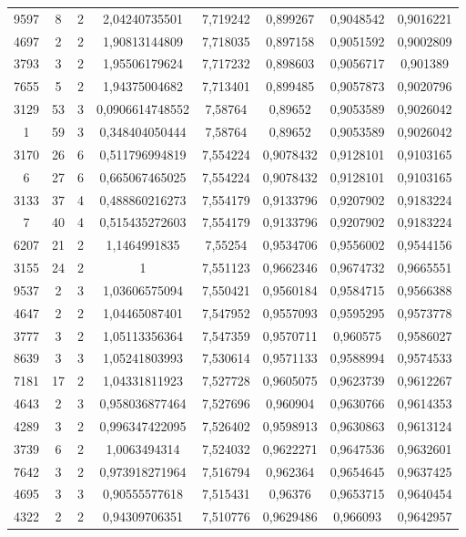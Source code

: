 \begin{longtable}{|c|c|c|c|c|c|c|c|}
9597 & 8 & 2 & 2,04240735501 & 7,719242 & 0,899267 & 0,9048542 & 0,9016221 \\
4697 & 2 & 2 & 1,90813144809 & 7,718035 & 0,897158 & 0,9051592 & 0,9002809 \\
3793 & 3 & 2 & 1,95506179624 & 7,717232 & 0,898603 & 0,9056717 & 0,901389 \\
7655 & 5 & 2 & 1,94375004682 & 7,713401 & 0,899485 & 0,9057873 & 0,9020796 \\
3129 & 53 & 3 & 0,0906614748552 & 7,58764 & 0,89652 & 0,9053589 & 0,9026042 \\
1 & 59 & 3 & 0,348404050444 & 7,58764 & 0,89652 & 0,9053589 & 0,9026042 \\
3170 & 26 & 6 & 0,511796994819 & 7,554224 & 0,9078432 & 0,9128101 & 0,9103165 \\
6 & 27 & 6 & 0,665067465025 & 7,554224 & 0,9078432 & 0,9128101 & 0,9103165 \\
3133 & 37 & 4 & 0,488860216273 & 7,554179 & 0,9133796 & 0,9207902 & 0,9183224 \\
7 & 40 & 4 & 0,515435272603 & 7,554179 & 0,9133796 & 0,9207902 & 0,9183224 \\
6207 & 21 & 2 & 1,1464991835 & 7,55254 & 0,9534706 & 0,9556002 & 0,9544156 \\
3155 & 24 & 2 & 1 & 7,551123 & 0,9662346 & 0,9674732 & 0,9665551 \\
9537 & 2 & 3 & 1,03606575094 & 7,550421 & 0,9560184 & 0,9584715 & 0,9566388 \\
4647 & 2 & 2 & 1,04465087401 & 7,547952 & 0,9557093 & 0,9595295 & 0,9573778 \\
3777 & 3 & 2 & 1,05113356364 & 7,547359 & 0,9570711 & 0,960575 & 0,9586027 \\
8639 & 3 & 3 & 1,05241803993 & 7,530614 & 0,9571133 & 0,9588994 & 0,9574533 \\
7181 & 17 & 2 & 1,04331811923 & 7,527728 & 0,9605075 & 0,9623739 & 0,9612267 \\
4643 & 2 & 3 & 0,958036877464 & 7,527696 & 0,960904 & 0,9630766 & 0,9614353 \\
4289 & 3 & 2 & 0,996347422095 & 7,526402 & 0,9598913 & 0,9630863 & 0,9613124 \\
3739 & 6 & 2 & 1,0063494314 & 7,524032 & 0,9622271 & 0,9647536 & 0,9632601 \\
7642 & 3 & 2 & 0,973918271964 & 7,516794 & 0,962364 & 0,9654645 & 0,9637425 \\
4695 & 3 & 3 & 0,90555577618 & 7,515431 & 0,96376 & 0,9653715 & 0,9640454 \\
4322 & 2 & 2 & 0,94309706351 & 7,510776 & 0,9629486 & 0,966093 & 0,9642957 \\

\end{longtable}

